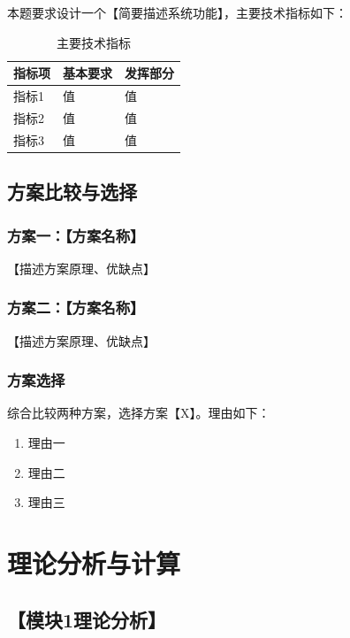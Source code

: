 \documentclass[12pt,a4paper]{ctexart}
\begin{document}
本题要求设计一个【简要描述系统功能】，主要技术指标如下：

\begin{table}[H]
\centering
\caption{主要技术指标}
\begin{tabular}{lll}
\toprule
\textbf{指标项} & \textbf{基本要求} & \textbf{发挥部分} \\
\midrule
指标1 & 值 & 值 \\
指标2 & 值 & 值 \\
指标3 & 值 & 值 \\
\bottomrule
\end{tabular}
\end{table}

\subsection{方案比较与选择}

\subsubsection{方案一：【方案名称】}

【描述方案原理、优缺点】

\subsubsection{方案二：【方案名称】}

【描述方案原理、优缺点】

\subsubsection{方案选择}

综合比较两种方案，选择方案【X】。理由如下：
\begin{enumerate}[label=(\arabic*)]
    \item 理由一
    \item 理由二
    \item 理由三
\end{enumerate}

\section{理论分析与计算}

\subsection{【模块1理论分析】}
\end{document}
